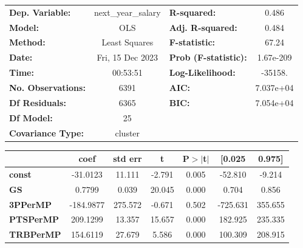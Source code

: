 \begin{center}
\begin{tabular}{lclc}
\toprule
\textbf{Dep. Variable:}             & next\_year\_salary & \textbf{  R-squared:         } &     0.486   \\
\textbf{Model:}                     &        OLS         & \textbf{  Adj. R-squared:    } &     0.484   \\
\textbf{Method:}                    &   Least Squares    & \textbf{  F-statistic:       } &     67.24   \\
\textbf{Date:}                      &  Fri, 15 Dec 2023  & \textbf{  Prob (F-statistic):} & 1.67e-209   \\
\textbf{Time:}                      &      00:53:51      & \textbf{  Log-Likelihood:    } &   -35158.   \\
\textbf{No. Observations:}          &         6391       & \textbf{  AIC:               } & 7.037e+04   \\
\textbf{Df Residuals:}              &         6365       & \textbf{  BIC:               } & 7.054e+04   \\
\textbf{Df Model:}                  &           25       & \textbf{                     } &             \\
\textbf{Covariance Type:}           &      cluster       & \textbf{                     } &             \\
\bottomrule
\end{tabular}
\begin{tabular}{lcccccc}
                                    & \textbf{coef} & \textbf{std err} & \textbf{t} & \textbf{P$> |$t$|$} & \textbf{[0.025} & \textbf{0.975]}  \\
\midrule
\textbf{const}                      &     -31.0123  &       11.111     &    -2.791  &         0.005        &      -52.810    &       -9.214     \\
\textbf{GS}                         &       0.7799  &        0.039     &    20.045  &         0.000        &        0.704    &        0.856     \\
\textbf{3PPerMP}                    &    -184.9877  &      275.572     &    -0.671  &         0.502        &     -725.631    &      355.655     \\
\textbf{PTSPerMP}                   &     209.1299  &       13.357     &    15.657  &         0.000        &      182.925    &      235.335     \\
\textbf{TRBPerMP}                   &     154.6119  &       27.679     &     5.586  &         0.000        &      100.309    &      208.915     \\

\end{tabular}
\end{center}
